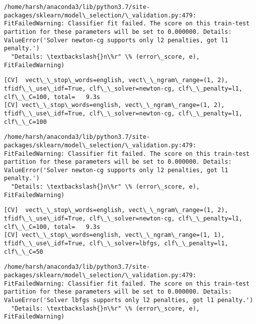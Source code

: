 \documentclass[11pt]{article}
\begin{document}
    \begin{Verbatim}[commandchars=\\\{\}]
/home/harsh/anaconda3/lib/python3.7/site-packages/sklearn/model\_selection/\_validation.py:479: FitFailedWarning: Classifier fit failed. The score on this train-test partition for these parameters will be set to 0.000000. Details: 
ValueError('Solver newton-cg supports only l2 penalties, got l1 penalty.')
  "Details: \textbackslash{}n\%r" \% (error\_score, e), FitFailedWarning)

    \end{Verbatim}

    \begin{Verbatim}[commandchars=\\\{\}]
[CV]  vect\_\_stop\_words=english, vect\_\_ngram\_range=(1, 2), tfidf\_\_use\_idf=True, clf\_\_solver=newton-cg, clf\_\_penalty=l1, clf\_\_C=100, total=   9.3s
[CV] vect\_\_stop\_words=english, vect\_\_ngram\_range=(1, 2), tfidf\_\_use\_idf=True, clf\_\_solver=newton-cg, clf\_\_penalty=l1, clf\_\_C=100 

    \end{Verbatim}

    \begin{Verbatim}[commandchars=\\\{\}]
/home/harsh/anaconda3/lib/python3.7/site-packages/sklearn/model\_selection/\_validation.py:479: FitFailedWarning: Classifier fit failed. The score on this train-test partition for these parameters will be set to 0.000000. Details: 
ValueError('Solver newton-cg supports only l2 penalties, got l1 penalty.')
  "Details: \textbackslash{}n\%r" \% (error\_score, e), FitFailedWarning)

    \end{Verbatim}

    \begin{Verbatim}[commandchars=\\\{\}]
[CV]  vect\_\_stop\_words=english, vect\_\_ngram\_range=(1, 2), tfidf\_\_use\_idf=True, clf\_\_solver=newton-cg, clf\_\_penalty=l1, clf\_\_C=100, total=   9.3s
[CV] vect\_\_stop\_words=english, vect\_\_ngram\_range=(1, 1), tfidf\_\_use\_idf=True, clf\_\_solver=lbfgs, clf\_\_penalty=l1, clf\_\_C=50 

    \end{Verbatim}

    \begin{Verbatim}[commandchars=\\\{\}]
/home/harsh/anaconda3/lib/python3.7/site-packages/sklearn/model\_selection/\_validation.py:479: FitFailedWarning: Classifier fit failed. The score on this train-test partition for these parameters will be set to 0.000000. Details: 
ValueError('Solver lbfgs supports only l2 penalties, got l1 penalty.')
  "Details: \textbackslash{}n\%r" \% (error\_score, e), FitFailedWarning)

    \end{Verbatim}
\end{document}
